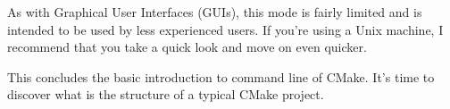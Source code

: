 As with Graphical User Interfaces (GUIs), this mode is fairly limited and is intended to be used by less experienced users. If you're using a Unix machine, I recommend that you take a quick look and move on even quicker.

This concludes the basic introduction to command line of CMake. It's time to discover what is the structure of a typical CMake project.
 
 
 
 
 
 
 
 
 
 
 
 
 
 
 
 